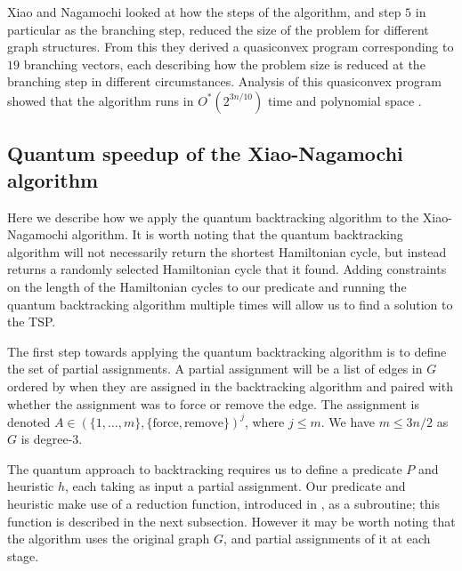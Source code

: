 Xiao and Nagamochi looked at how the steps of the algorithm, and step $5$ in particular as the branching step, reduced the size of the problem for different graph structures. From this they derived a quasiconvex program corresponding to $19$ branching vectors, each describing how the problem size is reduced at the branching step in different circumstances. Analysis of this quasiconvex program showed that the algorithm runs in $O^*(2^{3n/10})$ time and polynomial space \cite{xiao2016degree3}.

\subsection{Quantum speedup of the Xiao-Nagamochi algorithm}
\label{sec:deg3speedup}

Here we describe how we apply the quantum backtracking algorithm to the Xiao-Nagamochi algorithm. It is worth noting that the quantum backtracking algorithm will not necessarily return the shortest Hamiltonian cycle, but instead returns a randomly selected Hamiltonian cycle that it found. Adding constraints on the length of the Hamiltonian cycles to our predicate and running the quantum backtracking algorithm multiple times will allow us to find a solution to the TSP.

The first step towards applying the quantum backtracking algorithm is to define the set of partial assignments. A partial assignment will be a list of edges in $G$ ordered by when they are assigned in the backtracking algorithm and paired with whether the assignment was to force or remove the edge. The assignment is denoted $A \in (\{1,\dots,m\}, \{\text{force}, \text{remove}\})^j$, where $j \leq m$. We have $m \le 3n/2$ as $G$ is degree-3.


The quantum approach to backtracking requires us to define a predicate $P$ and heuristic $h$, each taking as input a partial assignment. Our predicate and heuristic make use of a reduction function, introduced in \cite{xiao2016degree3}, as a subroutine; this function is described in the next subsection. However it may be worth noting that the algorithm uses the original graph $G$, and partial assignments of it at each stage.

